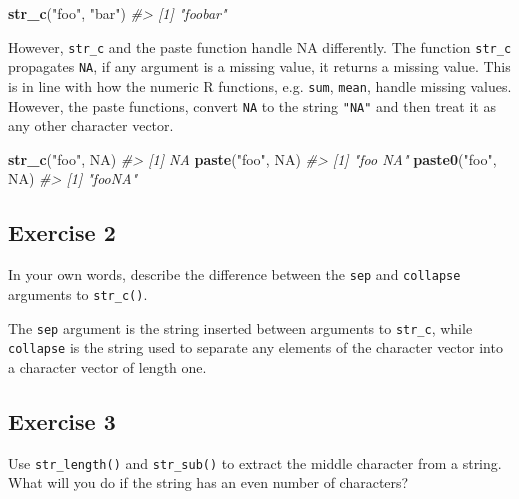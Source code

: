 \documentclass[]{book}
\newenvironment{Shaded}{\begin{snugshade}}{\end{snugshade}}
\newcommand{\CommentTok}[1]{\textcolor[rgb]{0.56,0.35,0.01}{\textit{#1}}}
\newcommand{\KeywordTok}[1]{\textcolor[rgb]{0.13,0.29,0.53}{\textbf{#1}}}
\newcommand{\NormalTok}[1]{#1}
\newcommand{\OtherTok}[1]{\textcolor[rgb]{0.56,0.35,0.01}{#1}}
\newcommand{\StringTok}[1]{\textcolor[rgb]{0.31,0.60,0.02}{#1}}
\theoremstyle{plain}
\theoremstyle{remark}
\theoremstyle{definition}
\theoremstyle{definition}
\theoremstyle{definition}
\theoremstyle{remark}
\begin{document}
\begin{Shaded}
\begin{Highlighting}[]
\KeywordTok{str_c}\NormalTok{(}\StringTok{"foo"}\NormalTok{, }\StringTok{"bar"}\NormalTok{)}
\CommentTok{#> [1] "foobar"}
\end{Highlighting}
\end{Shaded}

However, \texttt{str\_c} and the paste function handle NA differently.
The function \texttt{str\_c} propagates \texttt{NA}, if any argument is
a missing value, it returns a missing value. This is in line with how
the numeric R functions, e.g. \texttt{sum}, \texttt{mean}, handle
missing values. However, the paste functions, convert \texttt{NA} to the
string \texttt{"NA"} and then treat it as any other character vector.

\begin{Shaded}
\begin{Highlighting}[]
\KeywordTok{str_c}\NormalTok{(}\StringTok{"foo"}\NormalTok{, }\OtherTok{NA}\NormalTok{)}
\CommentTok{#> [1] NA}
\KeywordTok{paste}\NormalTok{(}\StringTok{"foo"}\NormalTok{, }\OtherTok{NA}\NormalTok{)}
\CommentTok{#> [1] "foo NA"}
\KeywordTok{paste0}\NormalTok{(}\StringTok{"foo"}\NormalTok{, }\OtherTok{NA}\NormalTok{)}
\CommentTok{#> [1] "fooNA"}
\end{Highlighting}
\end{Shaded}

\hypertarget{exercise-2-29}{%
\subsection{Exercise 2}\label{exercise-2-29}}

In your own words, describe the difference between the \texttt{sep} and
\texttt{collapse} arguments to \texttt{str\_c()}.

The \texttt{sep} argument is the string inserted between arguments to
\texttt{str\_c}, while \texttt{collapse} is the string used to separate
any elements of the character vector into a character vector of length
one.

\hypertarget{exercise-3-27}{%
\subsection{Exercise 3}\label{exercise-3-27}}

Use \texttt{str\_length()} and \texttt{str\_sub()} to extract the middle
character from a string. What will you do if the string has an even
number of characters?
\end{document}
